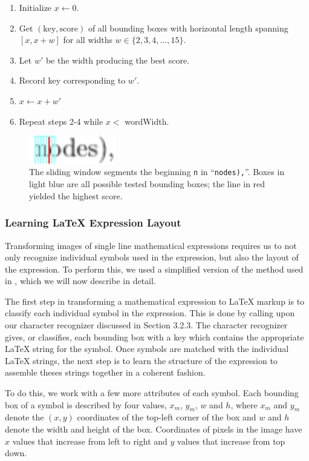 \documentclass[12pt]{IEEEtran}
\newcommand{\latex}{\LaTeX\xspace}
\begin{document}
\begin{enumerate}
\item Initialize $x \leftarrow 0$.
\item Get $(\text{key},\text{score})$ of all bounding boxes with horizontal length spanning $[x, x+w]$ for all widths $w \in \{2,3,4,\dots,15\}$.
\item Let $w'$ be the width producing the best score.
\item Record key corresponding to $w'$.
\item $x \leftarrow x + w'$
\item Repeat steps 2-4 while $x <$ wordWidth.
\end{enumerate}

\begin{figure}[h]
  \centering
    \includegraphics[width=1.5in]{word1-window.png}
  \caption{The sliding window segments the beginning \texttt{n} in ``\texttt{nodes),}''. Boxes in light blue are all possible tested bounding boxes; the line in red yielded the highest score.}
  \label{fig:wordWindow1}
\end{figure}

\subsubsection{Learning \latex Expression Layout}

Transforming images of single line mathematical expressions requires us to not only recognize individual symbols used in the expression, but also the layout of the expression. To perform this, we used a simplified version of the method used in \cite{4}, which we will now describe in detail. 

The first step in transforming a mathematical expression to \latex markup is to classify each individual symbol in the expression. This is done by calling upon our character recognizer discussed in Section 3.2.3. The character recognizer gives, or classifies, each bounding box with a key which contains the appropriate \latex string for the symbol. Once symbols are matched with the individual \latex strings, the next step is to learn the structure of the expression to assemble theses strings together in a coherent fashion.
 
To do this, we work with a few more attributes of each symbol. Each bounding box of a symbol is described by four values, $x_m$, $y_m$, $w$ and $h$, where $x_m$ and $y_m$ denote the $(x,y)$ coordinates of the top-left corner of the box and $w$ and $h$ denote the width and height of the box. Coordinates of pixels in the image have $x$ values that increase from left to right and $y$ values that increase from top down.
\end{document}
